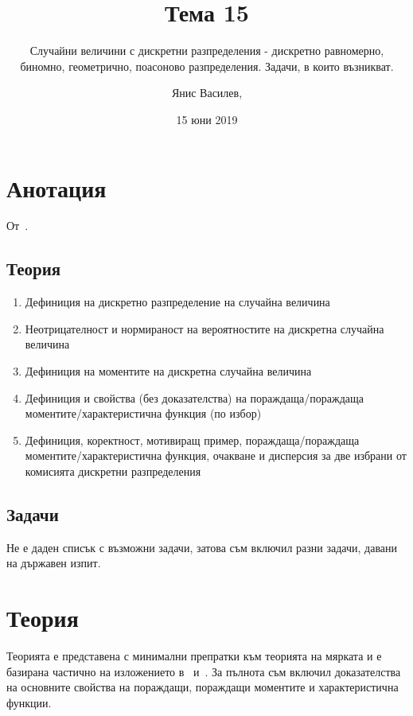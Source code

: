 \documentclass[numbers=endperiod, DIV=15, bibliography=totocnumbered]{scrartcl}
\title{Тема 15}
\subtitle{Случайни величини с дискретни разпределения - дискретно равномерно, биномно, геометрично, поасоново разпределения. Задачи, в които възникват.}
\author{Янис Василев, \Email{ianis@ivasilev.net}}
\date{15 юни 2019}
\begin{document}
\maketitle

\section{Анотация}

От~\cite{Syllabus}.

\subsection{Теория}

\begin{enumerate}
  \item Дефиниция на дискретно разпределение на случайна величина
  \item Неотрицателност и нормираност на вероятностите на дискретна случайна величина
  \item Дефиниция на моментите на дискретна случайна величина
  \item Дефиниция и свойства (без доказателства) на пораждаща/пораждаща моментите/характеристична функция (по избор)
  \item Дефиниция, коректност, мотивиращ пример, пораждаща/пораждаща моментите/характеристична функция, очакване и дисперсия за две избрани от комисията дискретни разпределения
\end{enumerate}

\subsection{Задачи}

Не е даден списък с възможни задачи, затова съм включил разни задачи, давани на държавен изпит.

\section{Теория}

Теорията е представена с минимални препратки към теорията на мярката и е базирана частично на изложението в~\cite{Borovkov} и~\cite{DimitrovYanev}. За пълнота съм включил доказателства на основните свойства на пораждащи, пораждащи моментите и характеристична функции.
\end{document}
